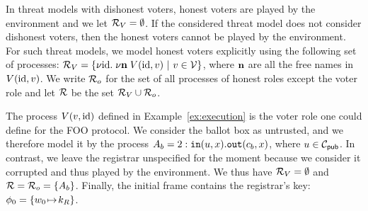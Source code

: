 In threat models with dishonest
voters, honest voters
are played by the environment and we let $\mathcal{R}_V=\emptyset$.
If the considered threat model does not consider dishonest voters, then 
the honest voters cannot be played by the environment.
For such threat models, we model  honest voters explicitly using the following set of processes:
$\roles_V=\{\nu\id.\; \nu\vect n\; V(\id,v)\ |\ v\in\mathcal{V}\}$,
where ${\mathbf{n}}$ are all the free names in $V(\mathrm{id},v)$.
We write $\mathcal{R}_o$ for the set of all processes of honest roles
except the voter role and let $\mathcal{R}$ be the set
$\mathcal{R}_V\cup\mathcal{R}_o$.

\begin{example}
\label{ex:foo-role}
The process $V(v,\mathrm{id})$ defined in Example~\ref{ex:execution}
is the voter role one could define for the FOO protocol.
We consider the ballot box as untrusted, and we
therefore model it by the process
$A_b=2:\mathtt{in}(u,x).\mathtt{out}(c_b,x)$, where $u\in\mathcal{C}_{\mathsf{pub}}$. %
In contrast, we leave the registrar unspecified for the moment
because we consider it corrupted and thus played by the
environment.%
We thus have $\mathcal{R}_V=\emptyset$ and $\mathcal{R}=\mathcal{R}_o=\{A_b\}$.
Finally, the initial frame contains the registrar's key:
$\phi_0=\{w_0\!\mapsto\! k_R\}$.
\end{example}


